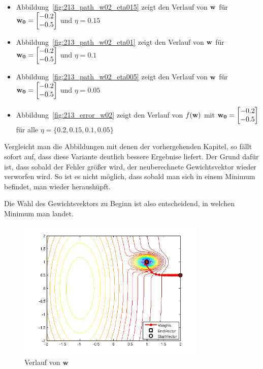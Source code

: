 \begin{itemize}
  \item Abbildung~\ref{fig:213_path_w02_eta015} zeigt den Verlauf von $\mathbf{w}$ für $\mathbf{w_0} = \begin{bmatrix} -0.2 \\ -0.5 \end{bmatrix}$ und $\eta = 0.15$
  \item Abbildung~\ref{fig:213_path_w02_eta01} zeigt den Verlauf von $\mathbf{w}$ für $\mathbf{w_0} = \begin{bmatrix} -0.2 \\ -0.5 \end{bmatrix}$ und $\eta = 0.1$
  \item Abbildung~\ref{fig:213_path_w02_eta005} zeigt den Verlauf von $\mathbf{w}$ für $\mathbf{w_0} = \begin{bmatrix} -0.2 \\ -0.5 \end{bmatrix}$ und $\eta = 0.05$
  \item Abbildung~\ref{fig:213_error_w02} zeigt den Verlauf von $f(\mathbf{w})$ mit $\mathbf{w_0} = \begin{bmatrix} -0.2 \\ -0.5 \end{bmatrix}$ für alle $\eta = \{0.2, 0.15, 0.1, 0.05\}$
\end{itemize}

Vergleicht man die Abbildungen mit denen der vorhergehenden Kapitel, so fällt sofort auf, dass diese
Variante deutlich bessere Ergebnise liefert. Der Grund dafür ist, dass sobald der Fehler größer wird,
der neuberechnete Gewichtsvektor wieder verworfen wird. So ist es nicht möglich, dass sobald man sich in einem
Minimum befindet, man wieder heraushüpft.

Die Wahl des Gewichtsvektors zu Beginn ist also entscheidend, in welchen Minimum man landet.

\begin{figure}[h!]
  \centering
  \includegraphics[width=0.8\textwidth]{./figures/213/path_w01_eta02.png}
  \caption{Verlauf von $\mathbf{w}$}
  \label{fig:213_path_w01_eta02}
\end{figure}

